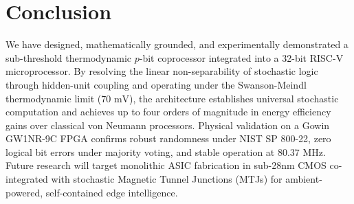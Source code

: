\documentclass[journal,10pt,twocolumn]{IEEEtran}
\begin{document}
\section{Conclusion}
We have designed, mathematically grounded, and experimentally demonstrated a sub-threshold thermodynamic $p$-bit coprocessor integrated into a 32-bit RISC-V microprocessor. By resolving the linear non-separability of stochastic logic through hidden-unit coupling and operating under the Swanson-Meindl thermodynamic limit ($70\text{ mV}$), the architecture establishes universal stochastic computation and achieves up to four orders of magnitude in energy efficiency gains over classical von Neumann processors. Physical validation on a Gowin GW1NR-9C FPGA confirms robust randomness under NIST SP 800-22, zero logical bit errors under majority voting, and stable operation at $80.37\text{ MHz}$. Future research will target monolithic ASIC fabrication in sub-28nm CMOS co-integrated with stochastic Magnetic Tunnel Junctions (MTJs) for ambient-powered, self-contained edge intelligence.



\end{document}
